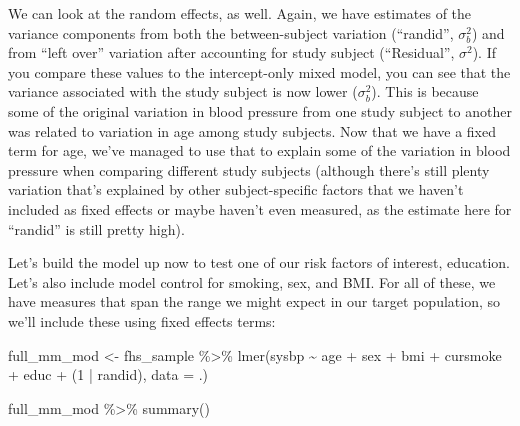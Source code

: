 \documentclass[
]{book}
\newenvironment{Shaded}{\begin{snugshade}}{\end{snugshade}}
\newcommand{\AttributeTok}[1]{\textcolor[rgb]{0.77,0.63,0.00}{#1}}
\newcommand{\DecValTok}[1]{\textcolor[rgb]{0.00,0.00,0.81}{#1}}
\newcommand{\FunctionTok}[1]{\textcolor[rgb]{0.00,0.00,0.00}{#1}}
\newcommand{\NormalTok}[1]{#1}
\newcommand{\OtherTok}[1]{\textcolor[rgb]{0.56,0.35,0.01}{#1}}
\newcommand{\SpecialCharTok}[1]{\textcolor[rgb]{0.00,0.00,0.00}{#1}}
\begin{document}
We can look at the random effects, as well. Again, we have estimates of the
variance components from both the between-subject variation (``randid'', \(\sigma_{b}^2\))
and from ``left over'' variation after accounting for study subject (``Residual'',
\(\sigma^2\)). If you compare these values to the intercept-only mixed model, you
can see that the variance associated with the study subject is now lower (\(\sigma_{b}^2\)).
This is because some of the original variation in blood pressure from one study
subject to another was related to variation in age among study subjects. Now that
we have a fixed term for age, we've managed to use that to explain some of the
variation in blood pressure when comparing different study subjects (although there's
still plenty variation that's explained by other subject-specific factors
that we haven't included as fixed effects or maybe haven't even measured,
as the estimate here for ``randid'' is still pretty high).

Let's build the model up now to test one of our risk factors of interest, education.
Let's also include model control for smoking, sex, and BMI. For all of these,
we have measures that span the range we might expect in our target population,
so we'll include these using fixed effects terms:

\begin{Shaded}
\begin{Highlighting}[]
\NormalTok{full\_mm\_mod }\OtherTok{\textless{}{-}}\NormalTok{ fhs\_sample }\SpecialCharTok{\%\textgreater{}\%} 
  \FunctionTok{lmer}\NormalTok{(sysbp }\SpecialCharTok{\textasciitilde{}}\NormalTok{ age }\SpecialCharTok{+}\NormalTok{ sex }\SpecialCharTok{+}\NormalTok{ bmi }\SpecialCharTok{+}\NormalTok{ cursmoke }\SpecialCharTok{+}\NormalTok{ educ }\SpecialCharTok{+}\NormalTok{ (}\DecValTok{1} \SpecialCharTok{|}\NormalTok{ randid), }
       \AttributeTok{data =}\NormalTok{ .) }

\NormalTok{full\_mm\_mod }\SpecialCharTok{\%\textgreater{}\%} 
  \FunctionTok{summary}\NormalTok{()}
\end{Highlighting}
\end{Shaded}
\end{document}

